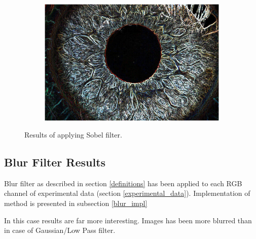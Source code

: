 \documentclass{article}
\begin{document}
\begin{figure}[H]
\begin{subfigure}{.09\textwidth}
\end{subfigure}%
\begin{subfigure}{.47\textwidth}
  \centering
  \includegraphics[width=0.97\linewidth]{_Figures/raw_data_4_sobel.png}
  \caption{}
  \label{fig:raw_4_sobel}
\end{subfigure}

\caption{Results of applying Sobel filter. }
\label{fig:sobel_results}
\end{figure}

%
%
\newpage
\subsection{Blur Filter Results}
Blur filter as described in section \ref{definitions} has been applied to each RGB channel of experimental data (section \ref{experimental_data}). Implementation of method is presented in subsection \ref{blur_impl}

In this case results are far more interesting. Images has been more blurred than in case of Gaussian/Low Pass filter. 
\end{document}
